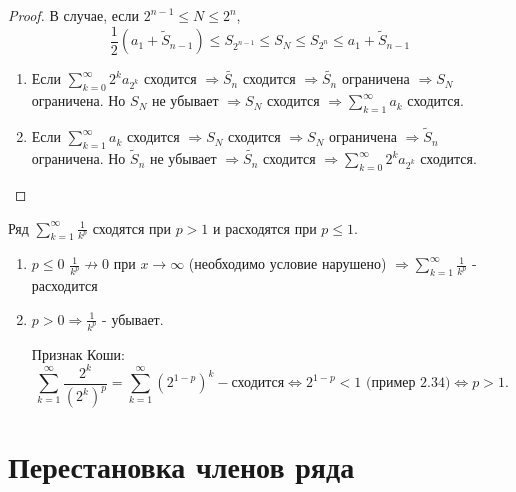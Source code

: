 \begin{proof}
		В случае, если $2^{n - 1} \leqslant N \leqslant 2^n$,
		\[ \frac{1}{2}(a_1 + \tilde{S}_{n - 1}) \leqslant S_{2^{n - 1}} \leqslant S_N \leqslant S_{2^n} \leqslant a_1 + \tilde{S}_{n - 1} \]
		\begin{enumerate}
			\item Если $\sum^{\infty}_{k = 0} 2^k a_{2^k}$ сходится $\Rightarrow \tilde{S_n}$ сходится $\Rightarrow \tilde{S_n}$ ограничена $\Rightarrow S_N$ ограничена. Но $S_N$ не убывает $\Rightarrow S_N$ сходится $\Rightarrow \sum^{\infty}_{k = 1} a_k$ сходится.
			\item Если $\sum^{\infty}_{k = 1} a_k$ сходится $\Rightarrow S_N$ сходится $\Rightarrow S_N$ ограничена $\Rightarrow \tilde{S}_n$ ограничена. Но $\tilde{S}_n$ не убывает $\Rightarrow \tilde{S_n}$ сходится $\Rightarrow \sum^{\infty}_{k = 0} 2^k a_{2^k}$ сходится.
		\end{enumerate}
	\end{proof}
	
	\begin{example}
		Ряд $\sum^{\infty}_{k = 1} \frac{1}{k^p}$ сходятся при $p > 1$ и расходятся при $p \leqslant 1$.
	\end{example}
	
	\begin{enumerate}
		\item $p \leqslant 0$ $\frac{1}{k^p} \not\to 0$ при $x \to \infty$ (необходимо условие нарушено) $\Rightarrow \sum^{\infty}_{k = 1} \frac{1}{k^p}$ - расходится
		\item $p > 0 \Rightarrow \frac{1}{k^p}$ - убывает.
		
		Признак Коши: 
		\[ \sum_{k = 1}^{\infty} \frac{2^k}{(2^k)^p} = \sum_{k = 1}^{\infty} (2^{1 - p})^k - \text{сходится} \Leftrightarrow 2^{1 - p} < 1 \text{ (пример 2.34)} \Leftrightarrow p > 1. \]
	\end{enumerate}
	
	\section{Перестановка членов ряда}
	
